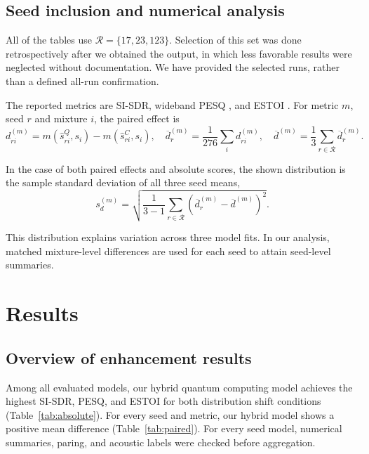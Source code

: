 \documentclass[10pt,a4paper]{article}
\begin{document}
\subsection{Seed inclusion and numerical analysis}\label{sec:selection}

All of the tables use $\mathcal R=\{17,23,123\}$. Selection of this set was done retrospectively after we obtained the output, in which less favorable results were neglected without documentation. We have provided the selected runs, rather than a defined all-run confirmation.


The reported metrics are SI-SDR, wideband PESQ \cite{pesq}, and ESTOI \cite{estoi}. For metric $m$, seed $r$ and mixture $i$, the paired effect is
\begin{equation}
d_{ri}^{(m)}=m(\widehat s_{ri}^{Q},s_i)-m(\widehat s_{ri}^{C},s_i),\quad
\overline d_r^{(m)}=\frac1{276}\sum_i d_{ri}^{(m)},\quad
\overline d^{(m)}=\frac13\sum_{r\in\mathcal R}\overline d_r^{(m)}.
\end{equation}

In the case of both paired effects and absolute scores, the shown distribution is the sample standard deviation of all three seed means,
\begin{equation}
s_d^{(m)}=\sqrt{\frac1{3-1}\sum_{r\in\mathcal R}(\overline d_r^{(m)}-\overline d^{(m)})^2}.
\end{equation}

This distribution explains variation across three model fits. In our analysis, matched mixture-level differences are used for each seed to attain seed-level summaries. 

\section{Results}
\subsection{Overview of enhancement results}

Among all evaluated models, our hybrid quantum computing model achieves the highest SI-SDR, PESQ, and ESTOI for both distribution shift conditions (Table~\ref{tab:absolute}). For every seed and metric, our hybrid model shows a positive mean difference (Table~\ref{tab:paired}). For every seed model, numerical summaries, paring, and acoustic labels were checked before aggregation. 
\end{document}
